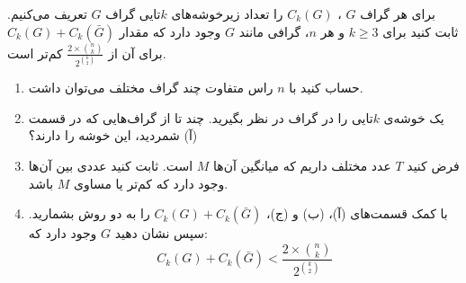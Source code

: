 \EXERCISE
برای هر گراف
$G$
،
$C_k(G)$
را تعداد زیرخوشه‌های $k$تایی گراف
$G$
تعریف می‌کنیم. ثابت کنید برای
$k \geq 3$
و هر $n$، گرافی مانند
$G$
وجود دارد که مقدار
$C_k(G) + C_k(\bar{G})$
برای آن از
$\frac{2 \times \binom n k}{2^{\binom k 2}}$
کم‌تر است.
\begin{enumerate}
\item
حساب کنید با 
$n$
راس متفاوت چند گراف مختلف می‌توان داشت.
\item
یک خوشه‌ی $k$تایی را در گراف در نظر بگیرید. چند تا از گراف‌هایی که در قسمت (آ) شمردید، این خوشه را دارند؟
\item
فرض کنید
$T$
عدد مختلف داریم که میانگین آن‌ها
$M$
است. ثابت کنید عددی بین آن‌ها وجود دارد که کم‌تر یا مساوی
$M$
باشد.
\item
با کمک قسمت‌های (آ)، (ب) و (ج)،
$C_k(G) + C_k(\bar{G})$
را به دو روش بشمارید. سپس نشان دهید
$G$
وجود دارد که:
$$C_k(G) + C_k(\bar{G}) < \frac{2 \times \binom n k}{2 ^{\binom k 2}}$$
\end{enumerate}